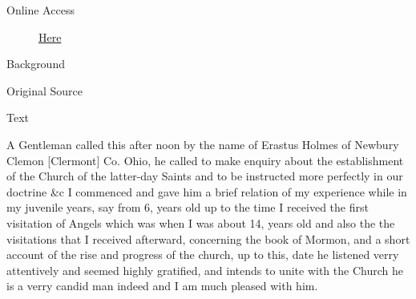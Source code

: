 			\begin{description}
				\item[Online Access] \href{https://www.josephsmithpapers.org/paper-summary/journal-1835-1836/37}{Here}
			\end{description}
			
			\begin{description}
				\item[Background]
			\end{description}
			
			
			\begin{description}
				\item[Original Source]
			\end{description}
			
			
			\begin{description}
				\item[Text]
			\end{description}
			
				A Gentleman called this after noon by the name of Erastus Holmes of Newbury Clemon [Clermont] Co. Ohio, he called to make enquiry about the establishment of the Church of the latter-day Saints and to be instructed more perfectly in our doctrine \&c I commenced and gave him a brief relation of my experience while in my juvenile years, say from 6, years old up to the time I received the first visitation of Angels which was when I was about 14, years old and also the the visitations that I received afterward, concerning the book of Mormon, and a short account of the rise and progress of the church, up to this, date he listened verry attentively and seemed highly gratified, and intends to unite with the Church he is a verry candid man indeed and I am much pleased with him.
				
